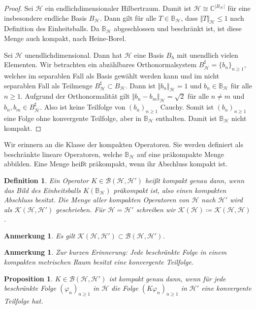 \documentclass[11pt, hidelinks]{article}
\newcommand{\h}{\mathcal{H}}
\newcommand{\on}{{n \geq 1}}
\numberwithin{conj}{section}
\newtheorem{definition}[conj]{Definition}
\newtheorem{remark}[conj]{Anmerkung}
\newtheorem{proposition}[conj]{Proposition}
\begin{document}
\begin{proof}
    Sei $\h$ ein endlichdimensionaler Hilbertraum. Damit ist $\h \cong \mathbb{C}^{\vert B_\h \vert}$ für eine insbesondere endliche Basis $B_\h$. Dann gilt für alle $T \in \mathbb{B}_\h$, dass $\Vert T \Vert_\h \leq 1$ nach Definition des Einheitsballs. Da $\mathbb{B}_\h$ abgeschlossen und beschränkt ist, ist diese Menge auch kompakt, nach Heine-Borel.

    Sei $\h$ unendlichdimensional. Dann hat $\h$ eine Basis $B_h$ mit unendlich vielen Elementen. Wir betrachten ein abzählbares Orthonormalsystem $B^\sharp_\h = \{b_n\}_\on$, welches im separablen Fall als Basis gewählt werden kann und im nicht separablen Fall als Teilmenge $B^\sharp_\h \subset B_\h$. Dann ist $\Vert b_n \Vert_\h = 1$ und $b_n \in \mathbb{B}_\h$ für alle $n \geq 1$. Aufgrund der Orthonormalität gilt $\Vert b_n - b_m \Vert_\h = \sqrt{2}$ für alle $n \neq m$ und $b_n,b_m \in B^\sharp_\h$. Also ist keine Teilfolge von $(b_n)_\on$ Cauchy. Somit ist $(b_n)_\on$ eine Folge ohne konvergente Teilfolge, aber in $\mathbb{B}_\h$ enthalten. Damit ist $\mathbb{B}_\h$ nicht kompakt.
\end{proof}

Wir erinnern an die Klasse der kompakten Operatoren. Sie werden definiert als beschränkte lineare Operatoren, welche $\mathbb{B}_\h$ auf eine präkompakte Menge abbilden. Eine Menge heißt präkompakt, wenn ihr Abschluss kompakt ist.

\begin{definition}
    Ein Operator $K \in \mathcal{B}(\h,\h')$ heißt kompakt genau dann, wenn das Bild des Einheitsballs $K(\mathbb{B}_\h)$ präkompakt ist, also einen kompakten Abschluss besitzt. Die Menge aller kompakten Operatoren von $\h$ nach $\h'$ wird als $\mathcal{K}(\h,\h')$ geschrieben. Für $\h=\h'$ schreiben wir $\mathcal{K}(\h) \coloneq \mathcal{K}(\h,\h)$. 
\end{definition}

\begin{remark}
    Es gilt $\mathcal{K}(\h,\h') \subset \mathcal{B}(\h,\h')$.
\end{remark}

\begin{remark}
Zur kurzen Erinnerung: Jede beschränkte Folge in einem kompakten metrischen Raum besitzt eine konvergente Teilfolge.
\end{remark}

\begin{proposition}
    $K \in \mathcal{B}(\h,\h')$ ist kompakt genau dann, wenn für jede beschränkte Folge $(\varphi_n)_{n \geq 1}$ in $\h$ die Folge $(K\varphi_n)_{n \geq 1}$ in $\h'$ eine konvergente Teilfolge hat.
\end{proposition}
\end{document}

